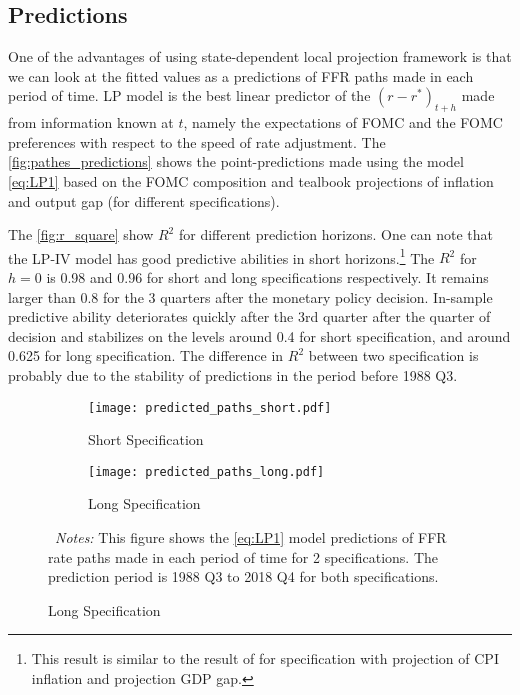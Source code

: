 \documentclass[11pt]{article}
\begin{document}
\subsection{Predictions}

One of the advantages of using state-dependent local projection framework is that we can look at the fitted values as a predictions of FFR paths made in each period of time.
LP model is the best linear predictor of the $\left(r-r^*\right)_{t+h}$ made from information known at $t$, namely the expectations of FOMC and the FOMC preferences with respect to the speed of rate adjustment. 
The \vref{fig:pathes_predictions} shows the point-predictions made using the model \vref{eq:LP1} based on the FOMC composition and tealbook projections of inflation and output gap (for different specifications). 

The \vref{fig:r_square} show $R^2$ for different prediction horizons. 
One can note that the LP-IV model has good predictive abilities in short horizons.\footnote{This result is similar to the result of \citet{Carvalho2021} for specification with projection of CPI inflation and projection GDP gap.}
The $R^2$ for $h=0$ is 0.98 and 0.96 for short and long specifications respectively. 
It remains larger than 0.8 for the 3 quarters after the monetary policy decision.
In-sample predictive ability deteriorates quickly after the 3rd quarter after the quarter of decision and stabilizes on the levels around 0.4 for short specification, and around 0.625 for long specification.
The difference in $R^2$ between two specification is probably due to the stability of predictions in the period before 1988 Q3.



\begin{figure}[!htbp]\centering
  \begin{minipage}{1\textwidth}\centering
    \caption{Predictions of FFR Paths Made in Each of the Period} 
    \label{fig:pathes_predictions}
    \vspace{1ex}
    \begin{subfigure}[b]{0.495\textwidth}\centering
      \caption{Short Specification}
      \label{fig:pathes_predictions_short}
      \texttt{[image: predicted\_paths\_short.pdf]}
    \end{subfigure}\hfill
    \begin{subfigure}[b]{0.495\textwidth}\centering
      \caption{Long Specification}
      \label{fig:pathes_predictions_long}
      \texttt{[image: predicted\_paths\_long.pdf]}
    \end{subfigure}
    {\begin{flushleft}
      \scriptsize ~\textit{Notes:} This figure shows the \vref{eq:LP1} model predictions of FFR rate paths made in each period of time for 2 specifications. The prediction period is 1988 Q3 to 2018 Q4 for both specifications.
    \end{flushleft}} 
    \end{minipage}

\end{figure}
\end{document}
